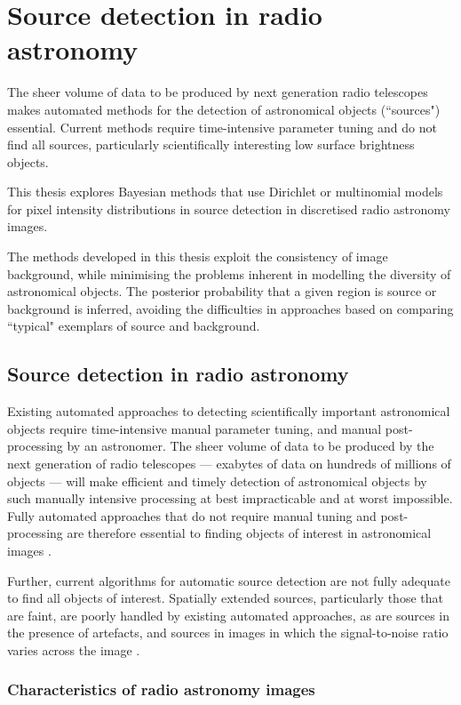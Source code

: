 \chapter{Source detection in radio astronomy}\label{C:intro}
The sheer volume of data to be produced by next generation radio telescopes makes automated methods for the detection of astronomical objects (``sources") essential. Current methods require time-intensive parameter tuning and do not find all sources, particularly scientifically interesting low surface brightness objects.

This thesis explores Bayesian methods that use Dirichlet or multinomial models for pixel intensity distributions in source detection in discretised radio astronomy images.

The methods developed in this thesis exploit the consistency of image background, while minimising the problems inherent in modelling the diversity of astronomical objects. The posterior probability that a given region is source or background is inferred, avoiding the difficulties in approaches based on comparing ``typical" exemplars of source and background.

\section{Source detection in radio astronomy}
Existing automated approaches to detecting scientifically important astronomical objects require time-intensive manual parameter tuning, and manual post-processing by an astronomer. The sheer volume of data to be produced by the next generation of radio telescopes --- exabytes of data on hundreds of millions of objects --- will make efficient and timely detection of astronomical objects by such manually intensive processing at best impracticable and at worst impossible. Fully automated approaches that do not require manual tuning and post-processing are therefore essential to finding objects of interest in astronomical images \cite{norris2011emu}.

Further, current algorithms for automatic source detection are not fully adequate to find all objects of interest. Spatially extended sources, particularly those that are faint, are poorly handled by existing automated approaches, as are sources in the presence of artefacts, and sources in images in which the signal-to-noise ratio varies across the image \cite{hollitt2012feature, norris2011emu, norris2012radio}.

\subsection{Characteristics of radio astronomy images}


